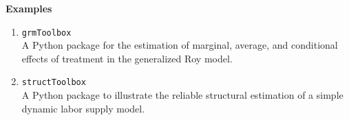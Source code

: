\begin{frame} 
\begin{center}\textbf{\huge Examples}\end{center}
\end{frame}


\begin{frame}[fragile]

\begin{enumerate}
\item \verb+grmToolbox+\\\vspace{0.2cm}
A Python package for the estimation of marginal, average, and conditional effects of treatment in the generalized Roy model.\\\vspace{0.3cm}
\item \verb+structToolbox+\\\vspace{0.2cm}
A Python package to illustrate the reliable structural estimation of a simple dynamic labor supply model.
\end{enumerate}

\end{frame}






